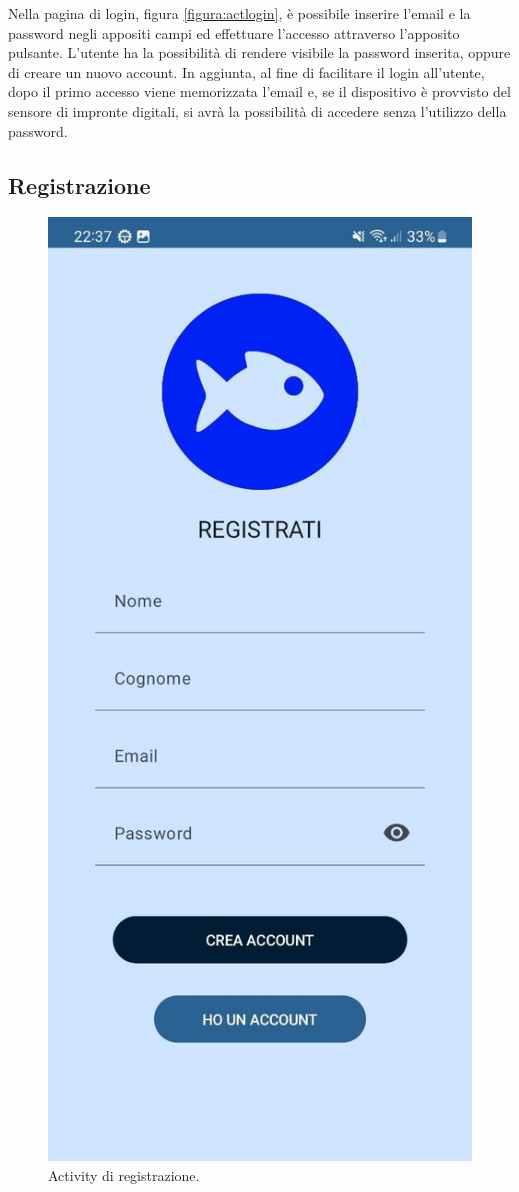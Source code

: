 \documentclass[a4paper,final,12pt]{report}
\begin{document}
Nella pagina di login, figura \ref{figura:actlogin}, è possibile inserire l'email e la password negli appositi campi ed effettuare l'accesso attraverso l'apposito pulsante. L'utente ha la possibilità di rendere visibile la password inserita, oppure di creare un nuovo account. In aggiunta, al fine di facilitare il login all'utente, dopo il primo accesso viene memorizzata l'email e, se il dispositivo è provvisto del sensore di impronte digitali, si avrà la possibilità di accedere senza l'utilizzo della password. 

\subsection{Registrazione}
\begin{figure}[hbtp]
\centering
\includegraphics[scale=0.19]{img_concettuale/regmob.jpg}
\caption{Activity di registrazione.}
\label{figura:actreg}
\end{figure}
\end{document}

